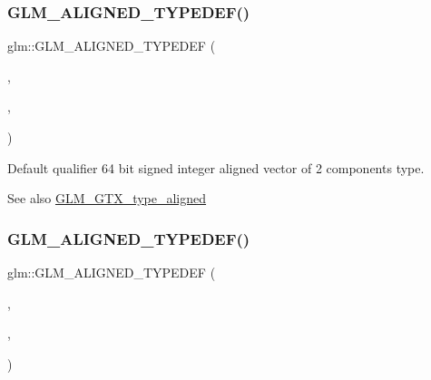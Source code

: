 \subsubsection{\texorpdfstring{G\+L\+M\+\_\+\+A\+L\+I\+G\+N\+E\+D\+\_\+\+T\+Y\+P\+E\+D\+E\+F()}{GLM\_ALIGNED\_TYPEDEF()}\hspace{0.1cm}{\footnotesize\ttfamily [66/209]}}
{\footnotesize\ttfamily glm\+::\+G\+L\+M\+\_\+\+A\+L\+I\+G\+N\+E\+D\+\_\+\+T\+Y\+P\+E\+D\+EF (\begin{DoxyParamCaption}\item[{\mbox{\hyperlink{group__gtc__type__precision_ga8654a1b3a6f81677f53eec13f8dd4224}{i64vec2}}}]{,  }\item[{aligned\+\_\+i64vec2}]{,  }\item[{16}]{ }\end{DoxyParamCaption})}

Default qualifier 64 bit signed integer aligned vector of 2 components type. \begin{DoxySeeAlso}{See also}
\mbox{\hyperlink{group__gtx__type__aligned}{G\+L\+M\+\_\+\+G\+T\+X\+\_\+type\+\_\+aligned}} 
\end{DoxySeeAlso}
\mbox{\label{group__gtx__type__aligned_gad77c317b7d942322cd5be4c8127b3187}} 
\subsubsection{\texorpdfstring{G\+L\+M\+\_\+\+A\+L\+I\+G\+N\+E\+D\+\_\+\+T\+Y\+P\+E\+D\+E\+F()}{GLM\_ALIGNED\_TYPEDEF()}\hspace{0.1cm}{\footnotesize\ttfamily [67/209]}}
{\footnotesize\ttfamily glm\+::\+G\+L\+M\+\_\+\+A\+L\+I\+G\+N\+E\+D\+\_\+\+T\+Y\+P\+E\+D\+EF (\begin{DoxyParamCaption}\item[{\mbox{\hyperlink{group__gtc__type__precision_gad7aa290b2d88847999c1305ed5c82669}{i64vec3}}}]{,  }\item[{aligned\+\_\+i64vec3}]{,  }\item[{32}]{ }\end{DoxyParamCaption})}

